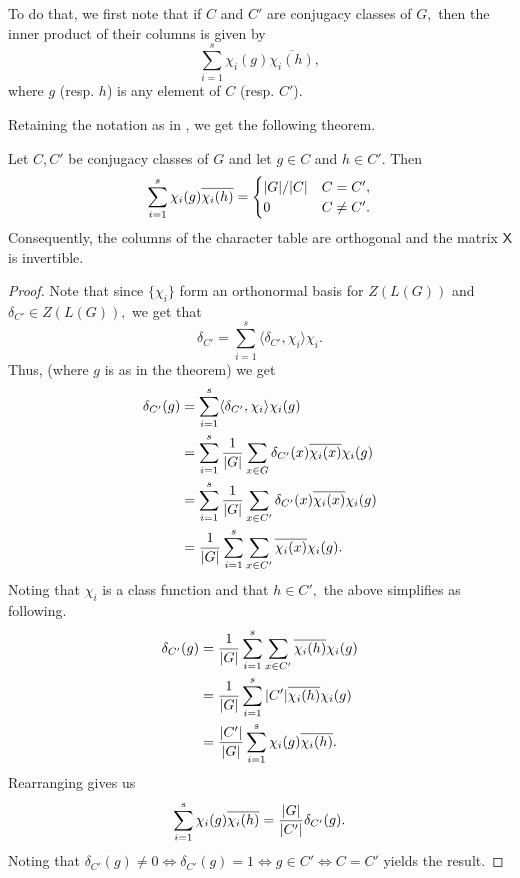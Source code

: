 To do that, we first note that if $C$ and $C'$ are conjugacy classes of $G,$ then the inner product of their columns is given by
\begin{equation*} 
	\sum_{i = 1}^{s}\chi_i(g)\overline{\chi_i(h)},
\end{equation*}
where $g$ (resp. $h$) is any element of $C$ (resp. $C'$).

Retaining the notation as in , we get the following theorem.

\begin{thm} \label{thm:secondorthorel}
	Let $C, C'$ be conjugacy classes of $G$ and let $g \in C$ and $h \in C'.$ Then
	\begin{equation*} 
		\sum_{i = 1}^{s} \chi_i(g)\overline{\chi_i(h)} = \begin{cases}
			{\left\lvert G \right\lvert}/{\left\lvert C \right\lvert} & C = C',\\
			0 & C \neq C'.
		\end{cases}
	\end{equation*}
	Consequently, the columns of the character table are orthogonal and the matrix $\mathsf{X}$ is invertible.
\end{thm}

\begin{proof} 
	Note that since $\{\chi_i\}$ form an orthonormal basis for $Z(L(G))$ and $\delta_{C'} \in Z(L(G)),$ we get that
	\begin{equation*} 
		\delta_{C'} = \sum_{i = 1}^{s} \langle \delta_{C'}, \chi_i\rangle \chi_i.
	\end{equation*}
	Thus, (where $g$ is as in the theorem) we get
	\begin{align*} 
		\delta_{C'}(g) &= \sum_{i = 1}^{s} \langle \delta_{C'}, \chi_i\rangle \chi_i(g)\\
		&= \sum_{i = 1}^{s} \dfrac{1}{{\left\lvert G \right\lvert}}\sum_{x \in G} \delta_{C'}(x)\overline{\chi_i(x)} \chi_i(g)\\
		&= \sum_{i = 1}^{s} \frac{1}{{\left\lvert G \right\lvert}} \sum_{x \in C'} \delta_{C'}(x)\overline{\chi_i(x)} \chi_i(g)\\
		&= \frac{1}{{\left\lvert G \right\lvert}}\sum_{i = 1}^{s} \sum_{x \in C'}\overline{\chi_i(x)} \chi_i(g).
	\end{align*}
	Noting that $\chi_i$ is a class function and that $h \in C',$ the above simplifies as following.
	\begin{align*} 
		\delta_{C'}(g) &= \frac{1}{{\left\lvert G \right\lvert}}\sum_{i = 1}^{s} \sum_{x \in C'}\overline{\chi_i(h)} \chi_i(g)\\
		&= \frac{1}{{\left\lvert G \right\lvert}}\sum_{i = 1}^{s} {\left\lvert C' \right\lvert}\overline{\chi_i(h)} \chi_i(g)\\
		&= \frac{{\left\lvert C' \right\lvert}}{{\left\lvert G \right\lvert}}\sum_{i = 1}^{s} \chi_i(g)\overline{\chi_i(h)}.
	\end{align*}
	Rearranging gives us
	\begin{equation*} 
		\sum_{i = 1}^{s} \chi_i(g)\overline{\chi_i(h)} = \frac{{\left\lvert G \right\lvert}}{{\left\lvert C' \right\lvert}}\delta_{C'}(g).
	\end{equation*}
	Noting that $\delta_{C'}(g) \neq 0 \iff \delta_{C'}(g) = 1 \iff g \in C' \iff C = C'$ yields the result.
\end{proof}


